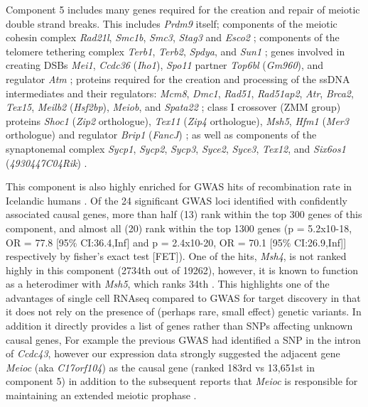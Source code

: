 Component 5 includes many genes required for the creation and repair of meiotic double strand breaks. This includes \textit{Prdm9} itself; components of the meiotic cohesin complex \textit{Rad21l}, \textit{Smc1b}, \textit{Smc3}, \textit{Stag3} and \textit{Esco2} \parencite{Rankin2015Complex}; components of the telomere tethering complex \textit{Terb1}, \textit{Terb2}, \textit{Spdya}, and \textit{Sun1} \parencite{Ding2007SUN1, Tu2017Speedy, Wang2019meiotic}; genes involved in creating DSBs \textit{Mei1}, \textit{Ccdc36} (\textit{Iho1}), \textit{Spo11} partner \textit{Top6bl} (\textit{Gm960}), and regulator \textit{Atm} \parencite{Lukaszewicz2018Control, Reinholdt2005Mei1, Robert2016TopoVIBLike, Stanzione2016Meiotic, Vrielynck2016DNA}; proteins required for the creation and processing of the ssDNA intermediates and their regulators: \textit{Mcm8}, \textit{Dmc1}, \textit{Rad51}, \textit{Rad51ap2}, \textit{Atr}, \textit{Brca2}, \textit{Tex15}, \textit{Meilb2} (\textit{Hsf2bp}), \textit{Meiob}, and \textit{Spata22} \parencite{Brown2015Small, Brown2014DNA, Dai2017Meiotic, Kovalenko2006RAD51AP2, Lee2015MCM89, Martinez2016BRCA2, Pacheco2018ATR, Ribeiro2018MEIOB, Widger2018ATR, Xu2017Meiosisspecific, Yang2008Mouse, Zhang2019meiosisspecific}; class I crossover (ZMM group) proteins \textit{Shoc1} (\textit{Zip2} orthologue), \textit{Tex11} (\textit{Zip4} orthologue), \textit{Msh5}, \textit{Hfm1} (\textit{Mer3} orthologue) and regulator \textit{Brip1} (\textit{FancJ}) \parencite{Adelman2008ZIP4H, Guiraldelli2018SHOC1, Guiraldelli2013Mouse, Rakshambikai2013Structural, Sun2016FancJ}; as well as components of the synaptonemal complex \textit{Sycp1}, \textit{Sycp2}, \textit{Sycp3}, \textit{Syce2}, \textit{Syce3}, \textit{Tex12}, and \textit{Six6os1} (\textit{4930447C04Rik}) \parencite{Gomez-H2016C14ORF39, Syrjanen2014molecular}.


This component is also highly enriched for GWAS hits of recombination rate in Icelandic humans \cite{Halldorsson2019Characterizing}. Of the 24 significant GWAS loci identified with confidently associated causal genes, more than half (13) rank within the top 300 genes of this component, and almost all (20) rank within the top 1300 genes (p = 5.2x10-18, OR = 77.8 [95\% CI:36.4,Inf] and p = 2.4x10-20, OR = 70.1 [95\% CI:26.9,Inf]] respectively by fisher's exact test [FET]). One of the hits, \textit{Msh4}, is not ranked highly in this component (2734th out of 19262), however, it is known to function as a heterodimer with \textit{Msh5}, which ranks 34th \cite{Rakshambikai2013Structural}. This highlights one of the advantages of single cell RNAseq compared to GWAS for target discovery in that it does not rely on the presence of (perhaps rare, small effect) genetic variants. In addition it directly provides a list of genes rather than SNPs affecting unknown causal genes, For example the previous GWAS had identified a SNP in the intron of \textit{Ccdc43}, however our expression data strongly suggested the adjacent gene \textit{Meioc} (aka \textit{C17orf104}) as the causal gene (ranked 183rd vs 13,651st in component 5) in addition to the subsequent reports that \textit{Meioc} is responsible for maintaining an extended meiotic prophase \cite{Abby2016Implementation, Kong2014Common, Soh2017Meioc}. 


